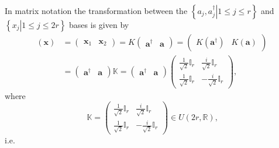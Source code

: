\documentclass[aps, preprint]{revtex4}
\begin{document}
In matrix notation the transformation between the $\left \{\left .a_{j} ,a_{j}^{ \dag }\right \vert 1 \leq j \leq r\right \}$ and $\left \{\left .x_{j}\right \vert 1 \leq j \leq 2 r\right \}$ bases is given by
\begin{align}\left (\mathbf{x}\right ) &  =\left (\begin{array}{cc}\mathbf{x}_{1} & \mathbf{x}_{2}\end{array}\right ) =K \left (\begin{array}{cc}\mathbf{a}^{ \dag } & \mathbf{a}\end{array}\right ) =\left (\begin{array}{cc}K \left (\mathbf{a}^{ \dag }\right ) & K \left (\mathbf{a}\right )\end{array}\right ) \\
 &  =\left (\begin{array}{cc}\mathbf{a}^{ \dag } & \mathbf{a}\end{array}\right ) \mathbb{K} =\left (\begin{array}{cc}\mathbf{a}^{ \dag } & \mathbf{a}\end{array}\right ) \left (\begin{array}{cc}\frac{1}{\sqrt{2}} \mathbb{I}_{r} & \frac{i}{\sqrt{2}} \mathbb{I}_{r} \\
\frac{1}{\sqrt{2}} \mathbb{I}_{r} &  -\frac{i}{\sqrt{2}} \mathbb{I}_{r}\end{array}\right )\text{,}\end{align}where
\begin{equation}\mathbb{K} =\left (\begin{array}{cc}\frac{1}{\sqrt{2}} \mathbb{I}_{r} & \frac{i}{\sqrt{2}} \mathbb{I}_{r} \\
\frac{1}{\sqrt{2}} \mathbb{I}_{r} &  -\frac{i}{\sqrt{2}} \mathbb{I}_{r}\end{array}\right ) \in U \left (2 r ,\mathbb{R}\right )\text{,}
\end{equation}i.e.
\end{document}
